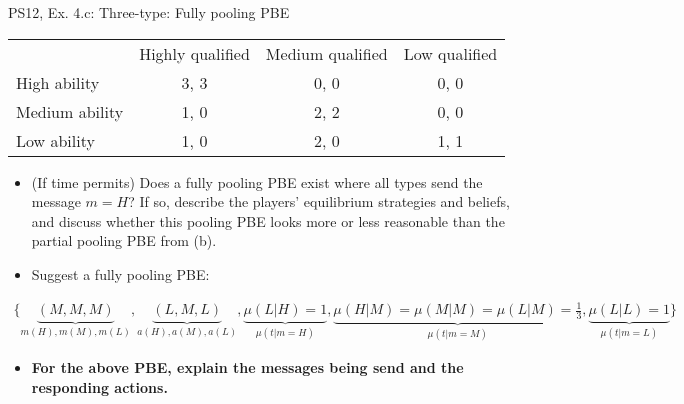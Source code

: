 \begin{frame}{PS12, Ex. 4.c: Three-type: Fully pooling PBE}
    \begin{table}
      \begin{tabular}{l|c|c|c|}
          \multicolumn{1}{c}{} & \multicolumn{1}{c}{Highly qualified} & \multicolumn{1}{c}{Medium qualified} & \multicolumn{1}{c}{Low qualified} \\\cline{2-4}
          High ability   & 3, 3 & 0, 0 & 0, 0 \\\cline{2-4}
          Medium ability & 1, 0 & 2, 2 & 0, 0 \\\cline{2-4}
          Low ability    & 1, 0 & 2, 0 & 1, 1 \\\cline{2-4}
      \end{tabular}
    \end{table}\vspace{-8pt}
    \begin{itemize}
      \item[(c)] (If time permits) Does a fully pooling PBE exist where all types send the message $m = H$? If so, describe the players’ equilibrium strategies and beliefs, and discuss whether this pooling PBE looks more or less reasonable than the partial pooling PBE from (b).
      \item[Step 1:] Suggest a fully pooling PBE:
    \end{itemize}\vspace{-12pt}
    \begin{align*}
      \{\underbrace{(M,M,M)}_{m(H),m(M),m(L)},\underbrace{(L,M,L)}_{a(H),a(M),a(L)},\underbrace{\mu(L|H)=1}_{\mu(t|m=H)},\underbrace{\mu(H|M)=\mu(M|M)=\mu(L|M)=\frac{1}{3}}_{\mu(t|m=M)},\underbrace{\mu(L|L)=1}_{\mu(t|m=L)}\}
    \end{align*}\vspace{-14pt}
    \begin{itemize}
        \item[Step 2:] \textbf{For the above PBE, explain the messages being send and the responding actions.}
    \end{itemize}\vspace{-2pt}
\end{frame}
